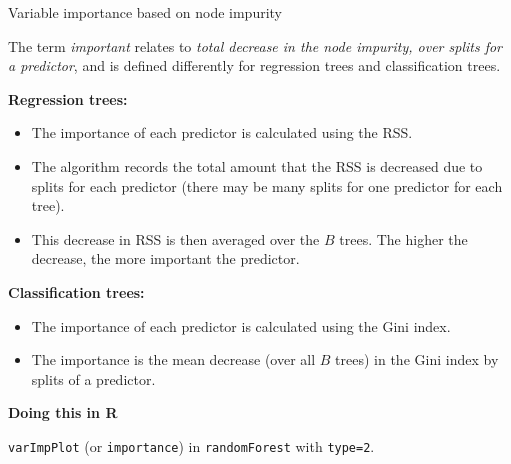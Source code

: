 \documentclass[10pt,ignorenonframetext,]{beamer}
\providecommand{\tightlist}{%
  \setlength{\itemsep}{0pt}\setlength{\parskip}{0pt}}
\begin{document}
\begin{frame}

\begin{block}{Variable importance based on node impurity}

\vspace{1mm}

The term \emph{important} relates to \emph{total decrease in the node
impurity, over splits for a predictor}, and is defined differently for
regression trees and classification trees.

\vspace{4mm}

\textbf{Regression trees:}

\begin{itemize}
\tightlist
\item
  The importance of each predictor is calculated using the RSS.
\item
  The algorithm records the total amount that the RSS is decreased due
  to splits for each predictor (there may be many splits for one
  predictor for each tree).
\item
  This decrease in RSS is then averaged over the \(B\) trees. The higher
  the decrease, the more important the predictor.
\end{itemize}

\end{block}

\end{frame}

\begin{frame}[fragile]

\textbf{Classification trees:}

\begin{itemize}
\tightlist
\item
  The importance of each predictor is calculated using the Gini index.
\item
  The importance is the mean decrease (over all \(B\) trees) in the Gini
  index by splits of a predictor.
\end{itemize}

\textbf{Doing this in R}

\texttt{varImpPlot} (or \texttt{importance}) in \texttt{randomForest}
with \texttt{type=2}.

\end{frame}
\end{document}
